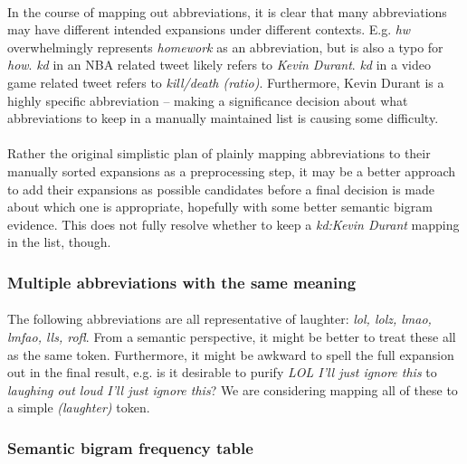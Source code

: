\documentclass{article}
\begin{document}
\paragraph{}In the course of mapping out abbreviations, it is clear that many abbreviations may have different intended expansions under different contexts. E.g. \textit{hw} overwhelmingly represents \textit{homework} as an abbreviation, but is also a typo for \textit{how}. \textit{kd} in an NBA related tweet likely refers to \textit{Kevin Durant}. \textit{kd} in a video game related tweet refers to \textit{kill/death (ratio)}. Furthermore, Kevin Durant is a highly specific abbreviation -- making a significance decision about what abbreviations to keep in a manually maintained list is causing some difficulty. 
\paragraph{} Rather the original simplistic plan of plainly mapping abbreviations to their manually sorted expansions as a preprocessing step, it may be a better approach to add their expansions as possible candidates before a final decision is made about which one is appropriate, hopefully with some better semantic bigram evidence. This does not fully resolve whether to keep a \textit{kd:Kevin Durant} mapping in the list, though.
\subsubsection*{Multiple abbreviations with the same meaning}
\paragraph{} The following abbreviations are all representative of laughter: \textit{lol, lolz, lmao, lmfao, lls, rofl}. From a semantic perspective, it might be better to treat these all as the same token. Furthermore, it might be awkward to spell the full expansion out in the final result, e.g. is it desirable to purify \textit{LOL I'll just ignore this} to \textit{laughing out loud I'll just ignore this}? We are considering mapping all of these to a simple \textit{(laughter)} token.
\subsubsection*{Semantic bigram frequency table}
\end{document}
